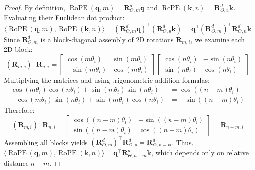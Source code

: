 \documentclass[11pt,a4paper]{article}
\theoremstyle{definition}
\begin{document}
\begin{proof}
By definition, $\operatorname{RoPE}(\mathbf{q}, m) = \mathbf{R}_{\Theta, m}^d \mathbf{q}$ and $\operatorname{RoPE}(\mathbf{k}, n) = \mathbf{R}_{\Theta, n}^d \mathbf{k}$.
Evaluating their Euclidean dot product:
{\boldmath
\begin{equation}
\langle \operatorname{RoPE}(\mathbf{q}, m), \operatorname{RoPE}(\mathbf{k}, n) \rangle = (\mathbf{R}_{\Theta, m}^d \mathbf{q})^\top (\mathbf{R}_{\Theta, n}^d \mathbf{k}) = \mathbf{q}^\top (\mathbf{R}_{\Theta, m}^d)^\top \mathbf{R}_{\Theta, n}^d \mathbf{k}
\end{equation}
}
Since $\mathbf{R}_{\Theta, m}^d$ is a block-diagonal assembly of 2D rotations $\mathbf{R}_{m, i}$, we examine each 2D block:
{\boldmath
\begin{equation}
(\mathbf{R}_{m, i})^\top \mathbf{R}_{n, i} = \begin{bmatrix} \cos(m\theta_i) & \sin(m\theta_i) \\ -\sin(m\theta_i) & \cos(m\theta_i) \end{bmatrix} \begin{bmatrix} \cos(n\theta_i) & -\sin(n\theta_i) \\ \sin(n\theta_i) & \cos(n\theta_i) \end{bmatrix}
\end{equation}
}
Multiplying the matrices and using trigonometric addition formulas:
{\boldmath
\begin{align}
\cos(m\theta_i)\cos(n\theta_i) + \sin(m\theta_i)\sin(n\theta_i) &= \cos((n-m)\theta_i) \\
-\cos(m\theta_i)\sin(n\theta_i) + \sin(m\theta_i)\cos(n\theta_i) &= -\sin((n-m)\theta_i)
\end{align}
}
Therefore:
{\boldmath
\begin{equation}
(\mathbf{R}_{m, i})^\top \mathbf{R}_{n, i} = \begin{bmatrix} \cos((n-m)\theta_i) & -\sin((n-m)\theta_i) \\ \sin((n-m)\theta_i) & \cos((n-m)\theta_i) \end{bmatrix} = \mathbf{R}_{n-m, i}
\end{equation}
}
Assembling all blocks yields $(\mathbf{R}_{\Theta, m}^d)^\top \mathbf{R}_{\Theta, n}^d = \mathbf{R}_{\Theta, n-m}^d$.
Thus, $\langle \operatorname{RoPE}(\mathbf{q}, m), \operatorname{RoPE}(\mathbf{k}, n) \rangle = \mathbf{q}^\top \mathbf{R}_{\Theta, n-m}^d \mathbf{k}$, which depends only on relative distance $n-m$.
\end{proof}
\end{document}
